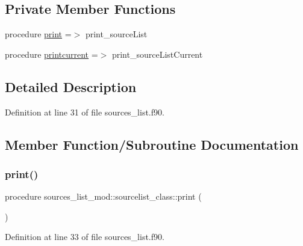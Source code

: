 \subsection*{Private Member Functions}
\begin{DoxyCompactItemize}
\item 
procedure \mbox{\hyperlink{structsources__list__mod_1_1sourcelist__class_aeb7dc43d8622507c3b4aa3b8ca6dcb0c}{print}} =$>$ print\+\_\+source\+List
\item 
procedure \mbox{\hyperlink{structsources__list__mod_1_1sourcelist__class_a576d79850badc14e33c5495460faf760}{printcurrent}} =$>$ print\+\_\+source\+List\+Current
\end{DoxyCompactItemize}


\subsection{Detailed Description}


Definition at line 31 of file sources\+\_\+list.\+f90.



\subsection{Member Function/\+Subroutine Documentation}
\mbox{\label{structsources__list__mod_1_1sourcelist__class_aeb7dc43d8622507c3b4aa3b8ca6dcb0c}} 
\subsubsection{\texorpdfstring{print()}{print()}}
{\footnotesize\ttfamily procedure sources\+\_\+list\+\_\+mod\+::sourcelist\+\_\+class\+::print (\begin{DoxyParamCaption}{ }\end{DoxyParamCaption})\hspace{0.3cm}{\ttfamily [private]}}



Definition at line 33 of file sources\+\_\+list.\+f90.

\mbox{\label{structsources__list__mod_1_1sourcelist__class_a576d79850badc14e33c5495460faf760}} 
